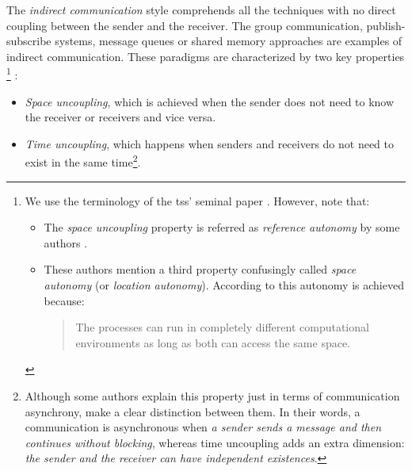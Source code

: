 The \emph{indirect communication} style comprehends all the techniques with no direct coupling between the sender and the receiver.
The group communication, publish-subscribe systems, message queues or shared memory approaches are examples of indirect communication.
These paradigms are characterized by two key properties \citep{gelernter_generative_1985,coulouris_distributed_2012}
\footnote{
  We use the terminology of the  \aclp{ts}' seminal paper \citep{gelernter_generative_1985}.
  However, note that:
  \begin{itemize}
    \item The \emph{space uncoupling} property is referred as \emph{reference autonomy} by some authors \citep{fensel_triple-space_2004}.
    \item These authors mention a third property confusingly called \emph{space autonomy} (or \emph{location autonomy}).
	  According to \citet{fensel_triple-space_2004} this autonomy is achieved because:
	  \begin{quote}
	    The processes can run in completely different computational environments as long as both can access the same space.
	  \end{quote}
  \end{itemize}
}
:

\begin{itemize}
 \item \emph{Space uncoupling}, which is achieved when the sender does not need to know the receiver or receivers and vice versa.
 \item \emph{Time uncoupling}, which happens when senders and receivers do not need to exist in the same time\footnote{
	  Although some authors \citep{fensel_triple-space_2004,krummenacher_www_2005} explain this property just in terms of communication asynchrony,
	  \citet{coulouris_distributed_2012} make a clear distinction between them.
	  In their words, a communication is asynchronous when \emph{a sender sends a message and then continues without blocking},
	  whereas time uncoupling adds an extra dimension: \emph{the sender and the receiver can have independent existences}.
	  }.
 
\end{itemize}




